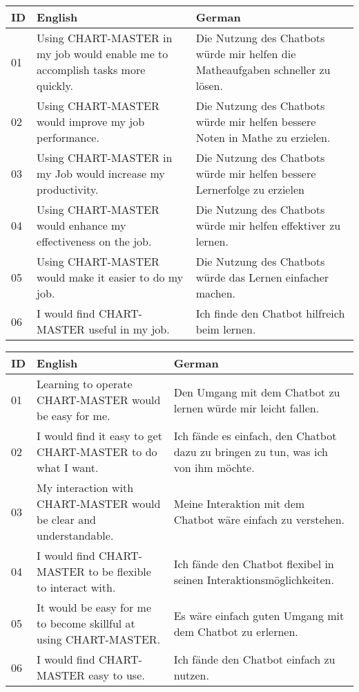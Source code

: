 \begin{ctable}
    \begin{tabularx}{\textwidth}{l|X|X}
        \textbf{ID} & \textbf{English} & \textbf{German} \\
        \hline
        01 & Using CHART-MASTER in my job would enable me to accomplish tasks more quickly. & Die Nutzung des Chatbots würde mir helfen die Matheaufgaben schneller zu lösen. \\
        02 & Using CHART-MASTER would improve my job performance. & Die Nutzung des Chatbots würde mir helfen bessere Noten in Mathe zu erzielen. \\
        03 & Using CHART-MASTER in my Job would increase my productivity. & Die Nutzung des Chatbots würde mir helfen bessere Lernerfolge zu erzielen \\
        04 & Using CHART-MASTER would enhance my effectiveness on the job. & Die Nutzung des Chatbots würde mir helfen effektiver zu lernen. \\
        05 & Using CHART-MASTER would make it easier to do my job. & Die Nutzung des Chatbots würde das Lernen einfacher machen. \\
        06 & I would find CHART-MASTER useful in my job. & Ich finde den Chatbot hilfreich beim lernen.
    \end{tabularx}
\end{ctable}

\begin{ctable}
    \begin{tabularx}{\textwidth}{l|X|X}
        \textbf{ID} & \textbf{English} & \textbf{German} \\
        \hline
        01 & Learning to operate CHART-MASTER would be easy for me. & Den Umgang mit dem Chatbot zu lernen würde mir leicht fallen. \\
        02 & I would find it easy to get CHART-MASTER to do what I want. & Ich fände es einfach, den Chatbot dazu zu bringen zu tun, was ich von ihm möchte. \\
        03 & My interaction with CHART-MASTER would be clear and understandable. & Meine Interaktion mit dem Chatbot wäre einfach zu verstehen. \\
        04 & I would find CHART-MASTER to be flexible to interact with. & Ich fände den Chatbot flexibel in seinen Interaktionsmöglichkeiten. \\
        05 & It would be easy for me to become skillful at using CHART-MASTER. & Es wäre einfach guten Umgang mit dem Chatbot zu erlernen. \\
        06 & I would find CHART-MASTER easy to use. & Ich fände den Chatbot einfach zu nutzen. \\
    \end{tabularx}
\end{ctable}

